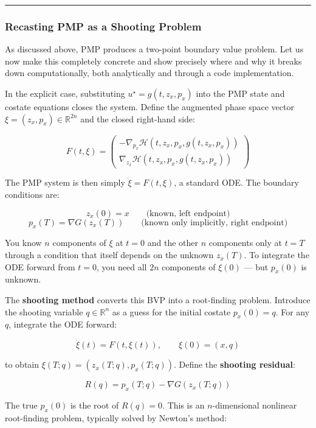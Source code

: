 \documentclass{article}
\begin{document}
\medskip\hrule\medskip

\subsubsection{Recasting PMP as a Shooting Problem}

As discussed above, PMP produces a two-point boundary value problem. Let us now make this completely concrete and show precisely where and why it breaks down computationally, both analytically and through a code implementation.

\begin{mathrequirementsbox}
In the explicit case, substituting $u^\star = g(t, z_x, p_x)$ into the PMP state and costate equations closes the system. Define the augmented phase space vector $\xi = (z_x, p_x) \in \mathbb{R}^{2n}$ and the closed right-hand side:

$$F(t, \xi) = \begin{pmatrix} -\nabla_{p_x}\mathcal{H}(t, z_x, p_x, g(t, z_x, p_x)) \\ \nabla_{z_x}\mathcal{H}(t, z_x, p_x, g(t, z_x, p_x)) \end{pmatrix}$$

The PMP system is then simply $\dot{\xi} = F(t, \xi)$, a standard ODE. The boundary conditions are:

$$z_x(0) = x \qquad \text{(known, left endpoint)}$$
$$p_x(T) = \nabla G(z_x(T)) \qquad \text{(known only implicitly, right endpoint)}$$

You know $n$ components of $\xi$ at $t=0$ and the other $n$ components only at $t=T$ through a condition that itself depends on the unknown $z_x(T)$. To integrate the ODE forward from $t=0$, you need all $2n$ components of $\xi(0)$ — but $p_x(0)$ is unknown.

The \textbf{shooting method} converts this BVP into a root-finding problem. Introduce the shooting variable $q \in \mathbb{R}^n$ as a guess for the initial costate $p_x(0) = q$. For any $q$, integrate the ODE forward:

$$\dot{\xi}(t) = F(t, \xi(t)), \qquad \xi(0) = (x, q)$$

to obtain $\xi(T; q) = (z_x(T; q), p_x(T; q))$. Define the \textbf{shooting residual}:

$$R(q) = p_x(T; q) - \nabla G(z_x(T; q))$$
\end{mathrequirementsbox}

The true $p_x(0)$ is the root of $R(q) = 0$. This is an $n$-dimensional nonlinear root-finding problem, typically solved by Newton's method:
\end{document}
